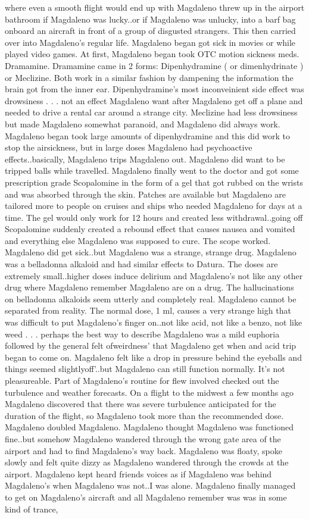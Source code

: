 \documentclass[12pt]{book}
\begin{document}
where even a smooth flight would end up with Magdaleno threw up in the airport bathroom if Magdaleno was lucky..or if Magdaleno was unlucky, into a barf bag onboard an aircraft in front of a group of disgusted strangers. This then carried over into Magdaleno's regular life. Magdaleno began got sick in movies or while played video games. At first, Magdaleno began took OTC motion sickness meds. Dramamine. Dramamine came in 2 forms: Dipenhydramine ( or dimenhydrinate ) or Meclizine. Both work in a similar fashion by dampening the information the brain got from the inner ear. Dipenhydramine's most inconveinient side effect was drowsiness . . .  not an effect Magdaleno want after Magdaleno get off a plane and needed to drive a rental car around a strange city. Meclizine had less drowsiness but made Magdaleno somewhat paranoid, and Magdaleno did always work. Magdaleno began took large amounts of dipenhydramine and this did work to stop the airsickness, but in large doses Magdaleno had psychoactive effects..basically, Magdaleno trips Magdaleno out. Magdaleno did want to be tripped balls while travelled. Magdaleno finally went to the doctor and got some prescription grade Scopalomine in the form of a gel that got rubbed on the wrists and was absorbed through the skin. Patches are available but Magdaleno are tailored more to people on cruises and ships who needed Magdaleno for days at a time. The gel would only work for 12 hours and created less withdrawal..going off Scopalomine suddenly created a rebound effect that causes nausea and vomited and everything else Magdaleno was supposed to cure. The scope worked. Magdaleno did get sick..but Magdaleno was a strange, strange drug. Magdaleno was a belladonna alkaloid and had similar effects to Datura. The doses are extremely small..higher doses induce delirium and Magdaleno's not like any other drug where Magdaleno remember Magdaleno are on a drug. The hallucinations on belladonna alkaloids seem utterly and completely real. Magdaleno cannot be separated from reality. The normal dose, 1 ml, causes a very strange high that was difficult to put Magdaleno's finger on..not like acid, not like a benzo, not like weed . . .  perhaps the best way to describe Magdaleno was a mild euphoria followed by the general felt ofweirdness' that Magdaleno get when and acid trip began to come on. Magdaleno felt like a drop in pressure behind the eyeballs and things seemed slightlyoff'..but Magdaleno can still function normally. It's not pleasureable. Part of Magdaleno's routine for flew involved checked out the turbulence and weather forecasts. On a flight to the midwest a few months ago Magdaleno discovered that there was severe turbulence anticipated for the duration of the flight, so Magdaleno took more than the recommended dose. Magdaleno doubled Magdaleno. Magdaleno thought Magdaleno was functioned fine..but somehow Magdaleno wandered through the wrong gate area of the airport and had to find Magdaleno's way back. Magdaleno was floaty, spoke slowly and felt quite dizzy as Magdaleno wandered through the crowds at the airport. Magdaleno kept heard friends voices as if Magdaleno was behind Magdaleno's when Magdaleno was not..I was alone. Magdaleno finally managed to get on Magdaleno's aircraft and all Magdaleno remember was was in some kind of trance, 
\end{document}
